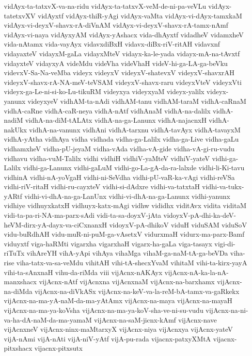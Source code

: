 {vidAyx-ta-tatxvX-va-na-ridu
vidAyx-ta-tatxvX-veM-de-ni-pa-veVLu
vidAyx-tatetxvXV
vidAyxtf
vidAyx-thiR-yAgi
vidAyx-vaMta
vidAyx-vi-dAyx-tamxkaM
vidAyx-vi-deyxV-shavx-rA-diVnAM
vidAyx-vi-deyxV-shavx-rA-tamx-nAmf
vidAyx-vi-naya
vidAyxyAM
vidAyx-yAshacx
vida-dhAyxtf
vidadheV
vidamxheV
vida-nAtamx
vida-vayAyx
vidavxdiBxH
vidavx-diBx-riV-ritAH
vidavxnf
vidayaxteV
vidayxM-gaLa
vidayxMteV
vidayx-ka-le-yada
vidayx-mA-na-tAvxtf
vidayxteV
vidayxyA
videMdu
videVha
videVhaH
videV-hi-ga-LA-ga-beVku
videvxV-Sa-Na-veMba
videyx
videyxV
videyxV-shatevxV
videyxV-shavxrAH
videyxV-shavx-rA-NA-meV-teVSAM
videyxV-shavx-raru
videyxVteV
videyxVti
videyx-ga-Le-ni-si-ko-Lu-tikuRM
videyxya
videyxyaM
videyx-yalilx
videyx-yanunx
videyxyeV
vidhAM-ta-nAdi
vidhAM-tanu
vidhAM-taraM
vidhA-caRnaM
vidhA-caRne
vidhA-caR-neya
vidhA-nAtf
vidhAnaM
vidhA-na-dalilx
vidhA-nadiM
vidhA-na-diM-tALAtx
vidhA-na-ga-Lanunx
vidhA-najacnxH
vidhA-nakUkx
vidhA-na-vanunx
vidhAni
vidhA-tarxnu
vidhA-tavAyx
vidhA-tavayxM
vidhA-yAtha
vidhAya
vidha
vidhada
vidha-ga-Lalilx
vidha-ga-Live
vidha-gaLu
vidhamxheV
vidha-pU-jeyaM
vidha-vAda
vidha-vA-gide
vidha-vA-gi-ru-vudu
vidhavu
vidha-vuM-Talilx
vidhi
vidhiH
vidhiV-yaMteV
vidhiV-yateV
vidhi-ga-Lalilx
vidhi-ga-Lanunx
vidhi-gaLuM
vidhi-go-La-gA-da-ra-lalxde
vidhi-li-Ki-tavu
vidhinA
vidhi-nA-yoVgaH
vidhi-ni-SeVdha
vidhi-pU-vaR-ka-vAgi
vidhi-reVSa
vidhi-riV-ritaH
vidhi-ru-cayxteV
vidhi-si-dAdxre
vidhi-va-tatxtaH
vidhi-va-tukx-yARtf
vidhi-vi-dhA-na-ga-LanUnx
vidhi-vi-dhA-na-ga-Lanunx
vidhi-yanunx
vidhiye
vidhuyxkatxH
vidhuyx-katx-mAgi
vidhw
vididhx
viditAvx
vidita
viditaM
vidi-ta-pa-ri-NA-ma-parx-sAdi
vidi-ta-sa-doyxV-jAta
vidoyxV-pA-dhi-ka-deV-heVM-dirx-yA-dayx-va-ciCxnanxH
vidoyxV-pA-dhikoV
viduH
viduSAM
viduSoV
vidu-buRdhAH
vidu-muR-ni-puM-ga-vAsetxV
vidurxmaH
vidurx-ma-parx-Bamf
viduyxtf
viga-haRMti
vigarxha
vigarxhaH
vigarx-ha-gaLa
viga-tasayx
vigi-di-riTuTx
vihAreYH
vihA-yApi
vihAya
vihaMga
vihaM-ga-naM-tA-ga-beVDa
viha-rise
viha-tatx-va-sa-veMdu
vihitAH
vihi-tA-shecxYvaM
vihitaM
vihi-ta-kirx-yayA
vihi-ta-sAnxnaH
vihu-da-riMda
viii
vijAcnx-nAKAyx
vijAcnx-nA-ka-la-nA-manxshacx
vijAcnx-nAtf
vijAcnxna
vijAcnxnaM
vijAcnx-na-barxhamx
vijAcnx-na-diMda
vijAcnx-na-diVkASx
vijAcnx-na-keV-va-la-reM-bA-tamx-va-gaRkekx
vijAcnx-na-ma-yA-naM-da-ma-yAtAmx
vijAcnx-na-maya
vijAcnx-na-mayaH
vijAcnx-na-ma-ya-koVsha
vijAcnx-na-ma-ya-koV-sha-ve-ni-su-vudu
vijAcnx-na-ni-va-ha-dA-naM-da-ma-yamaM
vijAcnx-na-saM-jicnx-kAmf
vijAcnx-nave
vijAcnxneV
vijAcnx-ninx-maMtarxyX
vijAcnx-niya
vijAcnxya
vijAcnx-yateV
vijA-nAmi
vijA-nAti
vijA-niV-yAtf
vijA-pu-rada
vijacnx-patxyXMtA
vijacnx-pitxshacx
vijacnx-pitxsutx
}
